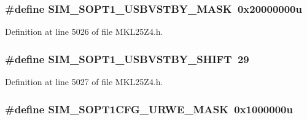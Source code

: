 \subsubsection[{\texorpdfstring{S\+I\+M\+\_\+\+S\+O\+P\+T1\+\_\+\+U\+S\+B\+V\+S\+T\+B\+Y\+\_\+\+M\+A\+SK}{SIM_SOPT1_USBVSTBY_MASK}}]{\setlength{\rightskip}{0pt plus 5cm}\#define S\+I\+M\+\_\+\+S\+O\+P\+T1\+\_\+\+U\+S\+B\+V\+S\+T\+B\+Y\+\_\+\+M\+A\+SK~0x20000000u}\hypertarget{group___s_i_m___register___masks_gaaf0b406e4bd1800083f48727a7cde829}{}\label{group___s_i_m___register___masks_gaaf0b406e4bd1800083f48727a7cde829}


Definition at line 5026 of file M\+K\+L25\+Z4.\+h.

\subsubsection[{\texorpdfstring{S\+I\+M\+\_\+\+S\+O\+P\+T1\+\_\+\+U\+S\+B\+V\+S\+T\+B\+Y\+\_\+\+S\+H\+I\+FT}{SIM_SOPT1_USBVSTBY_SHIFT}}]{\setlength{\rightskip}{0pt plus 5cm}\#define S\+I\+M\+\_\+\+S\+O\+P\+T1\+\_\+\+U\+S\+B\+V\+S\+T\+B\+Y\+\_\+\+S\+H\+I\+FT~29}\hypertarget{group___s_i_m___register___masks_gae945165e21faf14e58288bce0918482a}{}\label{group___s_i_m___register___masks_gae945165e21faf14e58288bce0918482a}


Definition at line 5027 of file M\+K\+L25\+Z4.\+h.

\subsubsection[{\texorpdfstring{S\+I\+M\+\_\+\+S\+O\+P\+T1\+C\+F\+G\+\_\+\+U\+R\+W\+E\+\_\+\+M\+A\+SK}{SIM_SOPT1CFG_URWE_MASK}}]{\setlength{\rightskip}{0pt plus 5cm}\#define S\+I\+M\+\_\+\+S\+O\+P\+T1\+C\+F\+G\+\_\+\+U\+R\+W\+E\+\_\+\+M\+A\+SK~0x1000000u}\hypertarget{group___s_i_m___register___masks_gaa4e1ee8f60c8c15ad553c2dfb82c2039}{}\label{group___s_i_m___register___masks_gaa4e1ee8f60c8c15ad553c2dfb82c2039}



